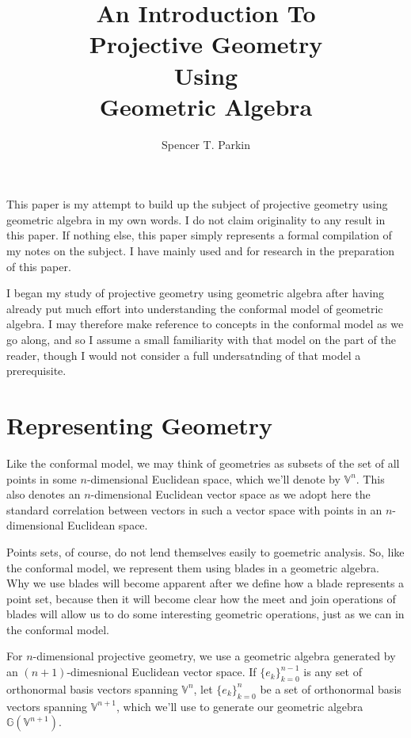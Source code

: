 \documentclass[12pt]{article}
\title{An Introduction To\\Projective Geometry\\Using\\Geometric Algebra}
\author{Spencer T. Parkin}
\newcommand{\G}{\mathbb{G}}
\newcommand{\V}{\mathbb{V}}
\begin{document}
\maketitle

This paper is my attempt to build up the subject of projective
geometry using geometric algebra in my own words.  I do not
claim originality to any result in this paper.  If nothing else, this
paper simply represents a formal compilation of my notes on the
subject.  I have mainly used \cite{hestenes91} and \cite{dorst07}
for research in the preparation of this paper.

I began my study of projective geometry using geometric algebra
after having already put much effort into understanding the
conformal model of geometric algebra.  I may therefore make reference
to concepts in the conformal model as we go along, and so I assume
a small familiarity with that model on the part of the reader, though I
would not consider a full undersatnding of that model a prerequisite.

\section{Representing Geometry}

Like the conformal model, we may think of geometries as subsets of the
set of all points in some $n$-dimensional Euclidean space, which we'll
denote by $\V^n$.  This also denotes an $n$-dimensional Euclidean vector space
as we adopt here the standard correlation between vectors in such a vector space
with points in an $n$-dimensional Euclidean space.

Points sets, of course, do not lend themselves easily to goemetric analysis.  So,
like the conformal model, we represent them using blades in a geometric algebra.
Why we use blades will become apparent after we define how a blade represents
a point set, because then it will become clear how the meet and join operations
of blades will allow us to do some interesting geometric operations, just as we
can in the conformal model.

For $n$-dimensional projective geometry, we use a geometric algebra generated
by an $(n+1)$-dimesnional Euclidean vector space.  If $\{e_k\}_{k=0}^{n-1}$ is any set of orthonormal basis
vectors spanning $\V^n$, let $\{e_k\}_{k=0}^n$ be a set of
orthonormal basis vectors spanning $\V^{n+1}$, which we'll use to generate our
geometric algebra $\G(\V^{n+1})$.
\end{document}
